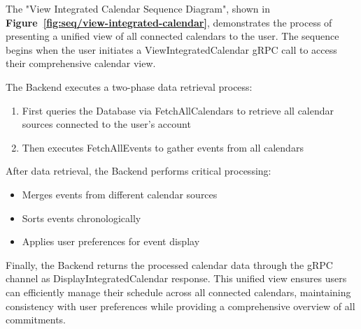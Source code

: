 The "View Integrated Calendar Sequence Diagram", shown in \textbf{Figure~\ref{fig:seq/view-integrated-calendar}}, demonstrates the process of presenting a unified view of all connected calendars to the user. The sequence begins when the user initiates a ViewIntegratedCalendar gRPC call to access their comprehensive calendar view.

The Backend executes a two-phase data retrieval process:
\begin{enumerate}
  \item First queries the Database via FetchAllCalendars to retrieve all calendar sources connected to the user's account
  \item Then executes FetchAllEvents to gather events from all calendars
\end{enumerate}

After data retrieval, the Backend performs critical processing:
\begin{itemize}
  \item Merges events from different calendar sources
  \item Sorts events chronologically
  \item Applies user preferences for event display
\end{itemize}

Finally, the Backend returns the processed calendar data through the gRPC channel as DisplayIntegratedCalendar response. This unified view ensures users can efficiently manage their schedule across all connected calendars, maintaining consistency with user preferences while providing a comprehensive overview of all commitments.